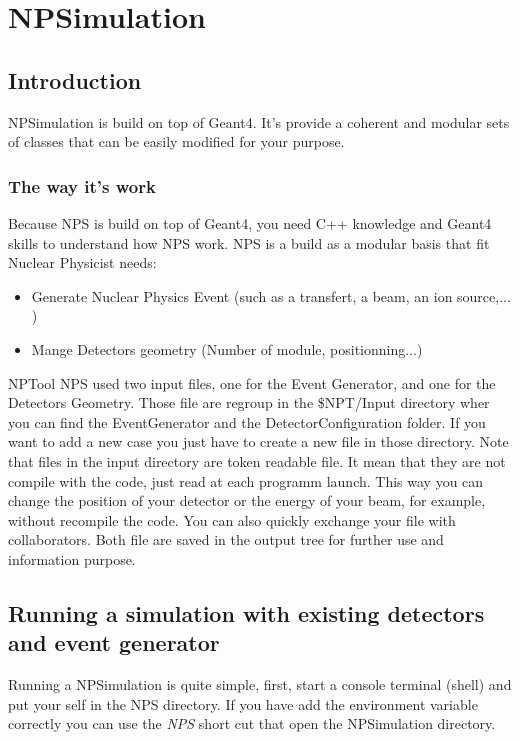 \documentclass{book}
\begin{document}
				
\chapter[NPSimulation]{NPSimulation}

\section{Introduction}

NPSimulation is build on top of Geant4. 
It's provide a coherent and modular sets of classes that can be easily modified for your purpose.

\subsection{ The way it's work }

Because NPS is build on top of Geant4, you need C++ knowledge and Geant4 skills to understand how NPS work. 
NPS is a build as a modular basis that fit Nuclear Physicist needs: 
	\begin{itemize}
		\item Generate Nuclear Physics Event (such as a transfert, a beam, an ion source,... ) 
		\item Mange Detectors geometry (Number of module, positionning...)
	\end{itemize}
NPTool
NPS used two input files, one for the Event Generator, and one for the Detectors Geometry. 
Those file are regroup in the \$NPT/Input directory wher you can find the EventGenerator and the DetectorConfiguration folder. If you want to add a new case you just have to create a new file in those directory. Note that files in the input directory are token readable file. It mean that they are not compile with the code, just read at each programm launch. This way you can change the position of your detector or the energy of your beam, for example, without recompile the code. You can also quickly exchange your file with collaborators. Both file are saved in the output tree for further use and information purpose.

\section{ Running a simulation with existing detectors and event generator }

Running a NPSimulation is quite simple, first, start a console terminal (shell) and put your self in the NPS directory.
If you have add the environment variable correctly you can use the \emph{NPS} short cut that open the NPSimulation directory.
	
\end{document}
